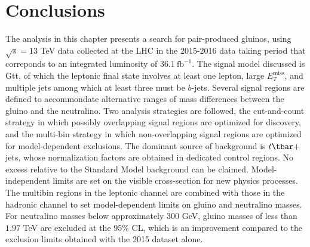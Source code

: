 \section{Conclusions}\label{mb:conc}

The analysis in this chapter presents a search for pair-produced gluinos, using
$\sqrt{s}=13$ TeV data collected at the LHC in the 2015-2016 data taking period
that correponds to an integrated luminosity of $36.1~\text{fb}^{-1}$. The
signal model discussed is Gtt, of which the leptonic final state involves at
least one lepton, large $E_{T}^{\text{miss}}$, and multiple jets among which at
least three must be $b$-jets. Several signal regions are defined to
accommondate alternative ranges of mass differences between the gluino and the
neutralino. Two analysis strategies are followed, the cut-and-count strategy in
which possibly overlapping signal regions are optimized for discovery, and the
multi-bin strategy in which non-overlapping signal regions are optimized for
model-dependent exclusions. The dominant source of background is $t\tbar+$jets,
whose normalization factors are obtained in dedicated control regions. No
excess relative to the Standard Model background can be claimed.
Model-independent limits are set on the visible cross-section for new physics
processes. The multibin regions in the leptonic channel are combined with those
in the hadronic channel to set model-dependent limits on gluino and neutralino
masses. For neutralino masses below approximately $300$ GeV, gluino masses of
less than $1.97$ TeV are excluded at the $95\%$ CL, which is an improvement
compared to the exclusion limits obtained with the 2015 dataset alone.

